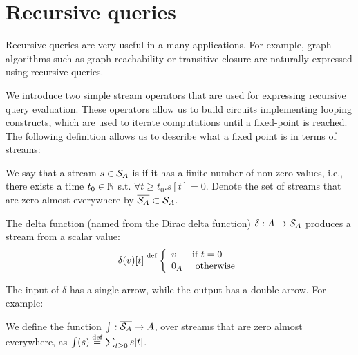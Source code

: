 \section{Recursive queries}\label{sec:recursion}

Recursive queries are very useful in a many applications.
For example, graph algorithms such as graph reachability
or transitive closure are naturally expressed using recursive queries.

We introduce two simple \dbsp stream operators that are used for
expressing recursive query evaluation.  These operators allow us
to build circuits implementing looping constructs, which
are used to iterate computations until a fixed-point is reached.
The following definition allows us to describe what a fixed point is
in terms of streams:

\begin{definition}[zero a.e.]\label{def:zae}
We say that a stream $s \in \mathcal{S}_{A}$ is  if it has a finite number of non-zero values, i.e.,
there exists a time $t_0 \in \mathbb{N}$ s.t. $\forall t \geq t_0.s[t] = 0$.
\noindent Denote the set of streams that are zero almost everywhere
by $\overline{\mathcal{S}_{A}} \subset \mathcal{S}_{A}$.
\end{definition}

\begin{definition}  The delta function (named from the
Dirac delta function) $\delta : A \rightarrow \mathcal{S}_{A}$ produces a
stream from a scalar value:
$$\delta(v)[t] \stackrel{\textrm{\scriptsize def}}{=} \left\{
\begin{array}{ll}
  v & \mbox{if } t = 0 \\
  0_A & \mbox{ otherwise}
\end{array}
\right.
$$
\end{definition}

The input of $\delta$ has a single arrow, while the output has a
double arrow.  For example:

\begin{center}
\end{center}

\begin{definition}
We define the function $\int : \overline{\mathcal{S}_{A}} \rightarrow A$, over
streams that are zero almost everywhere, as $\int(s) \stackrel{\textrm{\scriptsize def}}{=} \sum_{t
  \geq 0} s[t]$.
\end{definition}

